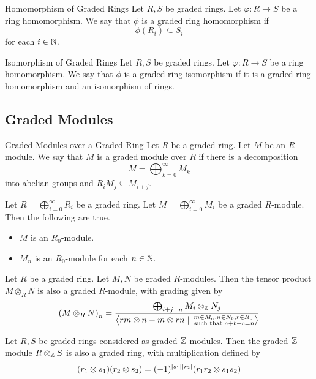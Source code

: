 \documentclass[a4paper]{article}
\begin{document}
\begin{defn}{Homomorphism of Graded Rings}{} Let $R,S$ be graded rings. Let $\varphi:R\to S$ be a ring homomorphism. We say that $\phi$ is a graded ring homomorphism if $$\phi(R_i)\subseteq S_i$$ for each $i\in\mathbb{N}$. 
\end{defn}

\begin{defn}{Isomorphism of Graded Rings}{} Let $R,S$ be graded rings. Let $\varphi:R\to S$ be a ring homomorphism. We say that $\phi$ is a graded ring isomorphism if it is a graded ring homomorphism and an isomorphism of rings. 
\end{defn}

\subsection{Graded Modules}
\begin{defn}{Graded Modules over a Graded Ring}{} Let $R$ be a graded ring. Let $M$ be an $R$-module. We say that $M$ is a graded module over $R$ if there is a decomposition $$M=\bigoplus_{k=0}^\infty M_k$$ into abelian groups and $R_iM_j\subseteq M_{i+j}$. 
\end{defn}

\begin{prp}{}{} Let $R=\bigoplus_{i=0}^\infty R_i$ be a graded ring. Let $M=\bigoplus_{i=0}^\infty M_i$ be a graded $R$-module. Then the following are true. 
\begin{itemize}
\item $M$ is an $R_0$-module. 
\item $M_n$ is an $R_0$-module for each $n\in\mathbb{N}$. 
\end{itemize}
\end{prp}

\begin{prp}{}{} Let $R$ be a graded ring. Let $M,N$ be graded $R$-modules. Then the tensor product $M\otimes_RN$ is also a graded $R$-module, with grading given by $$\left(M\otimes_RN\right)_n=\frac{\bigoplus_{i+j=n}M_i\otimes_{\mathbb{Z}} N_j}{\left\langle rm\otimes n-m\otimes rn\;|\;\substack{m\in M_a, n\in N_b, r\in R_c\\\text{ such that }a+b+c=n}\right\rangle}$$
\end{prp}

\begin{prp}{}{} Let $R,S$ be graded rings considered as graded $\mathbb{Z}$-modules. Then the graded $\mathbb{Z}$-module $R\otimes_{\mathbb{Z}} S$ is also a graded ring, with multiplication defined by $$(r_1\otimes s_1)(r_2\otimes s_2)=(-1)^{\abs{s_1}\abs{r_2}}(r_1r_2\otimes s_1s_2)$$
\end{prp}
\end{document}
